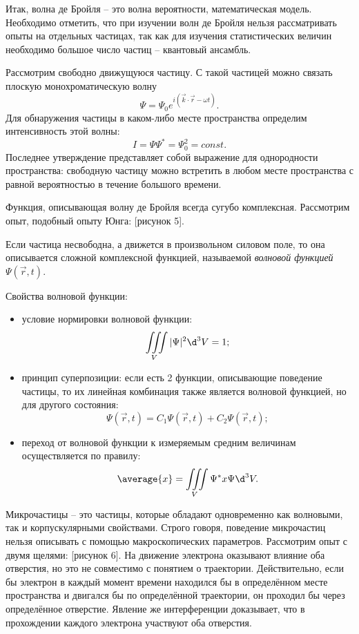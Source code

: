 Итак, волна де Бройля -- это волна вероятности, математическая модель.
Необходимо отметить, что при изучении волн де Бройля нельзя рассматривать опыты
на отдельных частицах, так как для изучения статистических величин необходимо
большое число частиц -- квантовый ансамбль.

Рассмотрим свободно движущуюся частицу. С такой частицей можно связать плоскую
монохроматическую волну
\[
    \Psi = \Psi_0 e^{i(\vec{k}\cdot\vec{r} - \omega t)}.
\]
Для обнаружения частицы в каком-либо месте пространства определим интенсивность
этой волны:
\[
    I = \Psi\Psi^* = \Psi_0^2 = const.
\]
Последнее утверждение представляет собой выражение для однородности
пространства: свободную частицу можно встретить в любом месте пространства с
равной вероятностью в течение большого времени.

Функция, описывающая волну де Бройля всегда сугубо комплексная. Рассмотрим опыт,
подобный опыту Юнга: [рисунок 5].

Если частица несвободна, а движется в произвольном силовом поле, то она
описывается сложной комплексной функцией, называемой \emph{волновой функцией}
\( \Psi(\vec{r}, t) \).

Свойства волновой функции:
\begin{itemize}
    \item условие нормировки волновой функции:
        \[
            \iiint\limits_V |\Psi|^2 \d^3 V = 1;
        \]
    \item принцип суперпозиции: если есть 2 функции, описывающие поведение
        частицы, то их линейная комбинация также  является волновой функцией,
        но для другого состояния:
    \[
        \Psi(\vec{r}, t) = C_1\Psi(\vec{r}, t) + C_2\Psi(\vec{r}, t);
    \]
    \item переход от волновой функции к измеряемым средним величинам
        осуществляется по правилу: 
    \[
        \average{x} = \iiint\limits_V \Psi^* x \Psi \d^3 V.
    \]
\end{itemize}

Микрочастицы -- это частицы, которые обладают одновременно как волновыми, так и
корпускулярными свойствами. Строго говоря, поведение микрочастиц нельзя
описывать с помощью макроскопических параметров. Рассмотрим опыт с двумя щелями:
[рисунок 6]. На движение электрона оказывают влияние оба отверстия, но это не
совместимо с понятием о траектории. Действительно, если бы электрон в каждый
момент времени находился бы в определённом месте пространства и двигался бы по
определённой траектории, он проходил бы через определённое отверстие. Явление же
интерференции доказывает, что в прохождении каждого электрона участвуют оба
отверстия.

